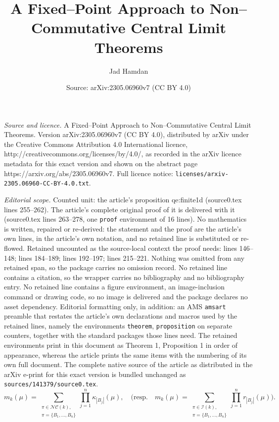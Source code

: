 \documentclass[10pt,a4paper]{amsart}
\title{A Fixed--Point Approach to Non--Commutative Central Limit Theorems}
\author{Jad Hamdan}
\date{Source: arXiv:2305.06960v7 (CC BY 4.0)}
\begin{document}
\maketitle

\noindent\emph{Source and licence.} A Fixed--Point Approach to Non--Commutative Central Limit Theorems. Version arXiv:2305.06960v7 (CC BY 4.0), distributed by arXiv under the Creative Commons Attribution 4.0 International licence, http://creativecommons.org/licenses/by/4.0/, as recorded in the arXiv licence metadata for this exact version and shown on the abstract page https://arxiv.org/abs/2305.06960v7. Full licence notice: \texttt{licenses/arxiv-2305.06960-CC-BY-4.0.txt}.\par\smallskip

\noindent\textit{Editorial scope.} Counted unit: the article's proposition qe:finite1d (source0.tex lines 255--262). The article's complete original proof of it is delivered with it (source0.tex lines 263--278, one \texttt{proof} environment of 16 lines). No mathematics is written, repaired or re-derived: the statement and the proof are the article's own lines, in the article's own notation, and no retained line is substituted or re-flowed.  Retained uncounted as the source-local context the proof needs: lines 146--148; lines 184--189; lines 192--197; lines 215--221.  Nothing was omitted from any retained span, so the package carries no omission record.  No retained line contains a citation, so the wrapper carries no bibliography and no bibliography entry.  No retained line contains a figure environment, an image-inclusion command or drawing code, so no image is delivered and the package declares no asset dependency.  Editorial formatting only, in addition: an AMS \texttt{amsart} preamble that restates the article's own declarations and macros used by the retained lines, namely the environments \texttt{theorem}, \texttt{proposition} on separate counters, together with the standard packages those lines need.  The retained environments print in this document as Theorem 1, Proposition 1 in order of appearance, whereas the article prints the same items with the numbering of its own full document.  The complete native source of the article as distributed in the arXiv e-print for this exact version is bundled unchanged as \texttt{sources/141379/source0.tex}.
\begin{equation}\label{momentcumulantfree}
    m_k(\mu) = \sum_{\substack{\pi \in \mathcal{NC}(k), \\\pi = \{B_1,...,B_n\}} } \prod_{j=1}^n \kappa_{|B_j|}(\mu),\quad \bigg(\text{resp.} \quad   m_k(\mu) = \sum_{\substack{\pi \in \mathcal{I}(k), \\\pi = \{B_1,...,B_n\} }} \prod_{j=1}^n r_{|B_j|}(\mu)\bigg).
\end{equation}
\end{document}
